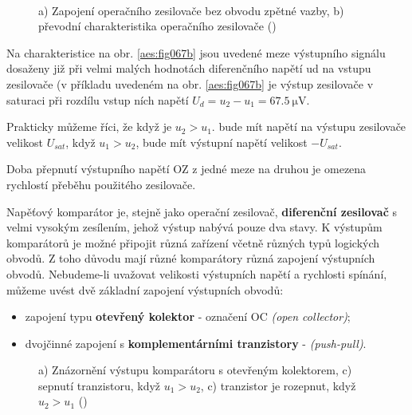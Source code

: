     \begin{figure}[ht!]  %
      \centering
       \\    
      \caption{a) Zapojení operačního zesilovače bez obvodu zpětné vazby, b) převodní
              charakteristika operačního zesilovače (\cite[s.~177]{Dolecek2007})}
      \label{aes:fig067}
    \end{figure}

    Na charakteristice na obr. \ref{aes:fig067b} jsou uvedené meze výstupního signálu dosaže­ny již
    při velmi malých hodnotách diferenčního napětí ud na vstupu zesilovače (v příkladu uvedeném na
    obr. \ref{aes:fig067b} je výstup zesilovače v saturaci při rozdílu vstup­ ních napětí \(U_d =
    u_2 - u_1 = \SI{67.5}{\micro\volt}\).

    Prakticky můžeme říci, že když je \(u_2 > u_1\). bude mít napětí na výstupu zesilovače velikost
    \(U_{sat}\), když \(u_1 > u_2\), bude mít výstupní napětí velikost \(-U_{sat}\).

    \begin{mdframed}[style=mdnote] 
      Doba přepnutí výstupního napětí OZ z jedné meze na druhou je omezena rychlostí přeběhu
      použitého zesilovače.
    \end{mdframed}

    Napěťový komparátor je, stejně jako operační zesilovač, \textbf{diferenční zesilovač} s velmi
    vysokým zesílením, jehož výstup nabývá pouze dva stavy. K výstupům komparátorů je možné připojit
    různá zařízení včetně různých typů logických obvodů. Z toho důvodu mají různé komparátory různá
    zapojení výstupních obvodů. Nebudeme-li uvažovat velikosti výstupních napětí a rychlosti
    spínání, můžeme uvést dvě základní zapojení výstupních obvodů:
    \begin{itemize}[noitemsep]
      \item zapojení typu \textbf{otevřený kolektor} - označení OC \emph{(open collector)};
      \item dvojčinné zapojení s \textbf{komplementárními tranzistory} - \emph{(push-pull)}.
    \end{itemize}

    \begin{figure}[ht!]  %
      \centering
       \newline    
       \newline
      \caption{a) Znázornění výstupu komparátoru s otevřeným kolektorem, c) sepnutí tranzistoru, 
              když  \(u_1 > u_2\), c) tranzistor je rozepnut, když \(u_2 > u_1\) 
              (\cite[s.~177]{Dolecek2007})}
      \label{aes:fig068}
    \end{figure}

